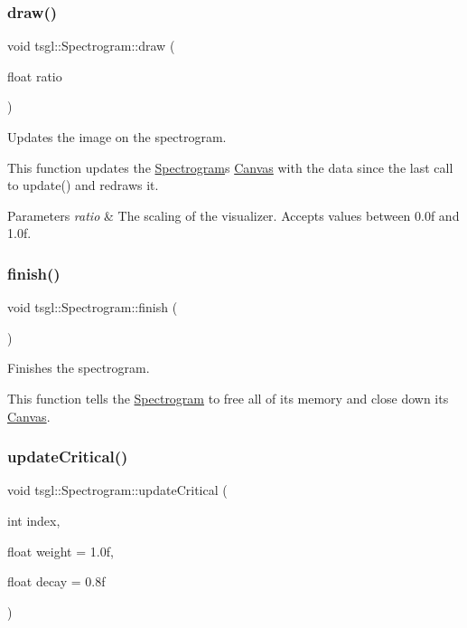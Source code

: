 \subsubsection{\texorpdfstring{draw()}{draw()}}
{\footnotesize\ttfamily void tsgl\+::\+Spectrogram\+::draw (\begin{DoxyParamCaption}\item[{float}]{ratio }\end{DoxyParamCaption})}



Updates the image on the spectrogram. 

This function updates the \hyperlink{classtsgl_1_1_spectrogram}{Spectrogram}\textquotesingle{}s \hyperlink{classtsgl_1_1_canvas}{Canvas} with the data since the last call to update() and redraws it. 
\begin{DoxyParams}{Parameters}
{\em ratio} & The scaling of the visualizer. Accepts values between 0.\+0f and 1.\+0f. \\
\hline
\end{DoxyParams}
\mbox{\label{classtsgl_1_1_spectrogram_a9e6eb0489ee0fb9f96b2a5202868a1c2}} 
\subsubsection{\texorpdfstring{finish()}{finish()}}
{\footnotesize\ttfamily void tsgl\+::\+Spectrogram\+::finish (\begin{DoxyParamCaption}{ }\end{DoxyParamCaption})}



Finishes the spectrogram. 

This function tells the \hyperlink{classtsgl_1_1_spectrogram}{Spectrogram} to free all of its memory and close down its \hyperlink{classtsgl_1_1_canvas}{Canvas}. \mbox{\label{classtsgl_1_1_spectrogram_a671efc29173bc9c5578090c3d4ff331a}} 
\subsubsection{\texorpdfstring{update\+Critical()}{updateCritical()}}
{\footnotesize\ttfamily void tsgl\+::\+Spectrogram\+::update\+Critical (\begin{DoxyParamCaption}\item[{int}]{index,  }\item[{float}]{weight = {\ttfamily 1.0f},  }\item[{float}]{decay = {\ttfamily 0.8f} }\end{DoxyParamCaption})}



